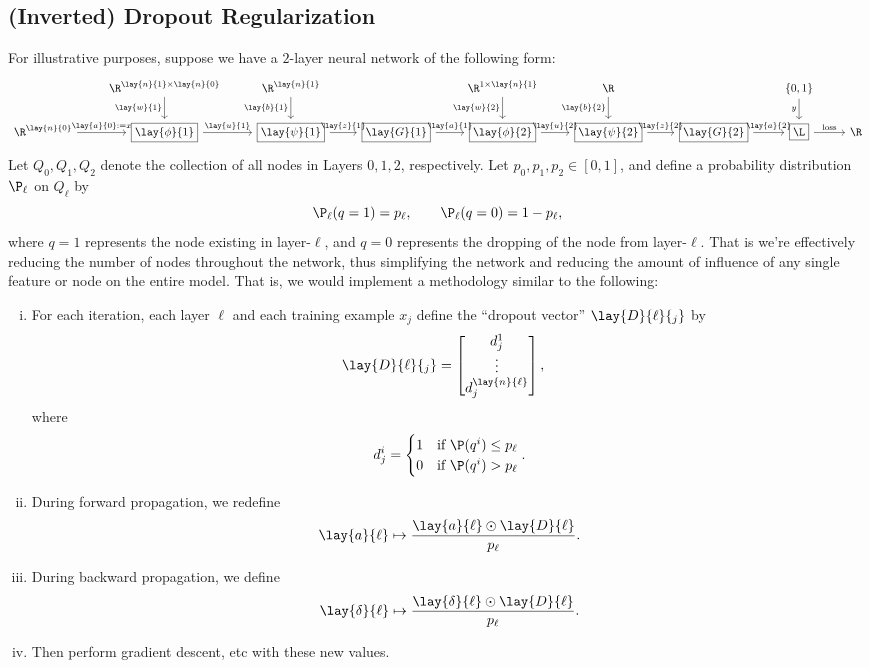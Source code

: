 \subsection{(Inverted) Dropout Regularization}
For illustrative purposes, suppose we have a $2$-layer neural network of the following form:
{\tiny
\begin{equation*}
	\begin{tikzcd}
		{}
		&\R^{\lay{n}{1}\times\lay{n}{0}}
		\arrow[d, swap, "\lay{w}{1}"]
		&\R^{\lay{n}{1}}
		\arrow[d, swap, "\lay{b}{1}"]
		&{}
		&\R^{1\times\lay{n}{1}}
		\arrow[d, swap, "\lay{w}{2}"]
		&\R
		\arrow[d, swap, "\lay{b}{2}"]
		&{}
		&\{0,1\}
		\arrow[d, swap, "y"]
		&{}
		\\
		\R^{\lay{n}{0}}
		\arrow[r, "\lay{a}{0}:=x"]
		&\boxed{\lay{\phi}{1}}
		\arrow[r, "\lay{u}{1}"]
		&\boxed{\lay{\psi}{1}}
		\arrow[r, "\lay{z}{1}"]
		&\boxed{\lay{G}{1}}
		\arrow[r, "\lay{a}{1}"]
		&\boxed{\lay{\phi}{2}}
		\arrow[r, "\lay{u}{2}"]
		&\boxed{\lay{\psi}{2}}
		\arrow[r, "\lay{z}{2}"]
		&\boxed{\lay{G}{2}}
		\arrow[r, "\lay{a}{2}"]
		&\boxed{\L}
		\arrow[r, "\text{loss}"]
		&\R
	\end{tikzcd}
\end{equation*}
}
Let $Q_0, Q_1, Q_2$ denote the collection of all nodes in Layers $0,1,2$, respectively.  Let $p_0, p_1, p_2\in[0,1]$, and define a probability distribution $\P_\ell$ on $Q_\ell$ by
$$\P_\ell(q=1)=p_\ell,\qquad \P_\ell(q=0)=1-p_\ell,$$
where $q=1$ represents the node existing in layer-$\ell$, and $q=0$ represents the dropping of the node from layer-$\ell$.  That is we're effectively reducing the number of nodes throughout the network, thus simplifying the network and reducing the amount of influence of any single feature or node on the entire model.  That is, we would implement a methodology similar to the following:
\begin{enumerate}[i.]
	\item For each iteration, each layer $\ell$ and each training example $x_j$ define the ``dropout vector'' $\lay{D}{\ell}{_j}$ by
	\begin{align*}
		\lay{D}{\ell}{_j}&=\begin{bmatrix}
			d^1_j\\
			\vdots\\
			d^{\lay{n}{\ell}}_j
		\end{bmatrix},
	\end{align*}
	where
	$$d^i_j=\begin{cases}
		1&\text{if }\P(q^i)\leq p_\ell\\
		0&\text{if }\P(q^i)>p_\ell
	\end{cases}.$$
	\item During forward propagation, we redefine
	$$\lay{a}{\ell}\mapsto \frac{\lay{a}{\ell}\odot \lay{D}{\ell}}{p_\ell}.$$
	\item During backward propagation, we define
	$$\lay{\delta}{\ell}\mapsto \frac{\lay{\delta}{\ell}\odot\lay{D}{\ell}}{p_\ell}.$$
	\item Then perform gradient descent, etc with these new values.
\end{enumerate}

